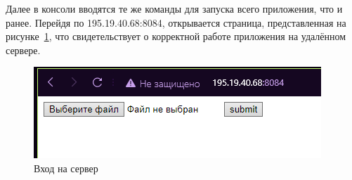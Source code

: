 Далее в консоли вводятся те же команды для запуска всего приложения, что и ранее. Перейдя по 195.19.40.68:8084, открывается страница, представленная на рисунке~\ref{rndhpcgui.2022.12.07.picture2}, что свидетельствует о корректной работе приложения на удалённом сервере.
\begin{figure}[!ht]
  \centering
  \includegraphics[scale=0.8]{ResearchNotes/rndhpc_dev_gui_2022_12_07/rndhpcgui.2022.12.07.picture2.png}
  \caption{Вход на сервер}
  \label{rndhpcgui.2022.12.07.picture2}
\end{figure}

\noteattributes{}
